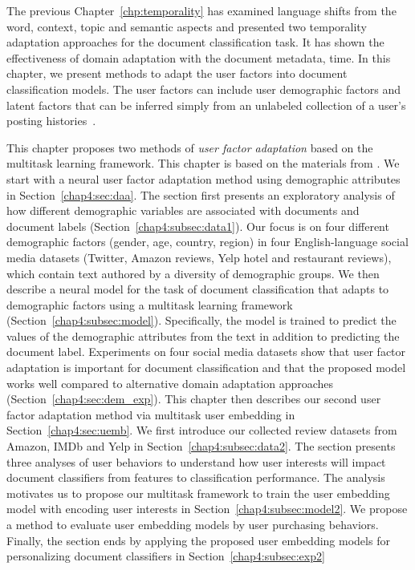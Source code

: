 The previous Chapter~\ref{chp:temporality} has examined language shifts from the word, context, topic and semantic aspects and presented two temporality adaptation approaches for the document classification task. 
It has shown the effectiveness of domain adaptation with the document metadata, time.
In this chapter, we present methods to adapt the user factors into document classification models. 
The user factors can include user demographic factors and latent factors that can be inferred simply from an unlabeled collection of a user's posting histories~\cite{lynn2017human}.

This chapter proposes two methods of \textit{user factor adaptation} based on the multitask learning framework. 
This chapter is based on the materials from \cite{huang2019neuraluser, huang2020user}.
We start with a neural user factor adaptation method using demographic attributes in Section~\ref{chap4:sec:daa}.
The section first presents an exploratory analysis of how different demographic variables are associated with documents and document labels (Section~\ref{chap4:subsec:data1}).
Our focus is on four different demographic factors (gender, age, country, region) in four English-language social media datasets (Twitter, Amazon reviews, Yelp hotel and restaurant reviews), which contain text authored by a diversity of demographic groups.
We then describe a neural model for the task of document classification that adapts to demographic factors using a multitask learning framework (Section~\ref{chap4:subsec:model}). Specifically, the model is trained to predict the values of the demographic attributes from the text in addition to predicting the document label. 
Experiments on four social media datasets show that user factor adaptation is important for document classification and that the proposed model works well compared to alternative domain adaptation approaches (Section~\ref{chap4:sec:dem_exp}).
This chapter then describes our second user factor adaptation method via multitask user embedding in Section~\ref{chap4:sec:uemb}.
We first introduce our collected review datasets from Amazon, IMDb and Yelp in Section~\ref{chap4:subsec:data2}.
The section presents three analyses of user behaviors to understand how user interests will impact document classifiers from features to classification performance.
The analysis motivates us to propose our multitask framework to train the user embedding model with encoding user interests in Section~\ref{chap4:subsec:model2}. 
We propose a method to evaluate user embedding models by user purchasing behaviors. 
Finally, the section ends by applying the proposed user embedding models for personalizing document classifiers in Section~\ref{chap4:subsec:exp2}

